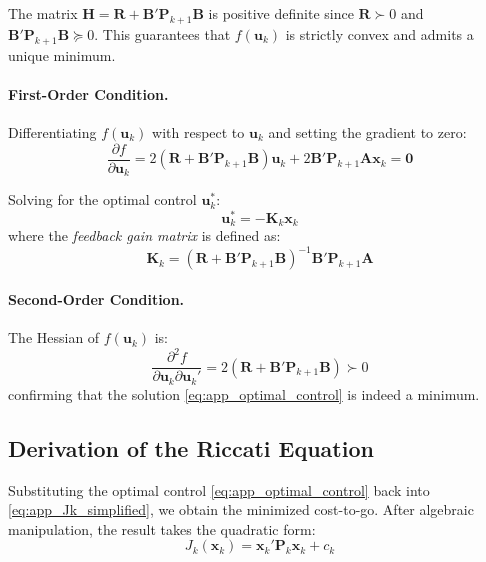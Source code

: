 \documentclass[12pt, a4paper]{article}
\begin{document}
The matrix $\bm{H} = \bm{R} + \bm{B}' \bm{P}_{k+1} \bm{B}$ is 
positive definite since $\bm{R} \succ 0$ and 
$\bm{B}' \bm{P}_{k+1} \bm{B} \succeq 0$. This guarantees that 
$f(\bm{u}_k)$ is strictly convex and admits a unique minimum.

\paragraph{First-Order Condition.}
Differentiating $f(\bm{u}_k)$ with respect to $\bm{u}_k$ and 
setting the gradient to zero:
\begin{equation}
    \frac{\partial f}{\partial \bm{u}_k} = 
    2(\bm{R} + \bm{B}' \bm{P}_{k+1} \bm{B}) \bm{u}_k + 
    2 \bm{B}' \bm{P}_{k+1} \bm{A} \bm{x}_k = \bm{0}
    \label{eq:app_FOC}
\end{equation}

Solving for the optimal control $\bm{u}_k^*$:
\begin{equation}
    \boxed{\bm{u}_k^* = -\bm{K}_k \bm{x}_k}
    \label{eq:app_optimal_control}
\end{equation}
where the \textit{feedback gain matrix} is defined as:
\begin{equation}
    \boxed{\bm{K}_k = (\bm{R} + \bm{B}' \bm{P}_{k+1} \bm{B})^{-1} 
    \bm{B}' \bm{P}_{k+1} \bm{A}}
    \label{eq:app_gain}
\end{equation}

\paragraph{Second-Order Condition.}
The Hessian of $f(\bm{u}_k)$ is:
\begin{equation}
    \frac{\partial^2 f}{\partial \bm{u}_k \partial \bm{u}_k'} = 
    2(\bm{R} + \bm{B}' \bm{P}_{k+1} \bm{B}) \succ 0
    \label{eq:app_SOC}
\end{equation}
confirming that the solution \eqref{eq:app_optimal_control} is 
indeed a minimum.

\subsection{Derivation of the Riccati Equation}

Substituting the optimal control \eqref{eq:app_optimal_control} 
back into \eqref{eq:app_Jk_simplified}, we obtain the minimized 
cost-to-go. After algebraic manipulation, the result takes the 
quadratic form:
\begin{equation}
    J_k(\bm{x}_k) = \bm{x}_k' \bm{P}_k \bm{x}_k + c_k
    \label{eq:app_Jk_quadratic}
\end{equation}
\end{document}
